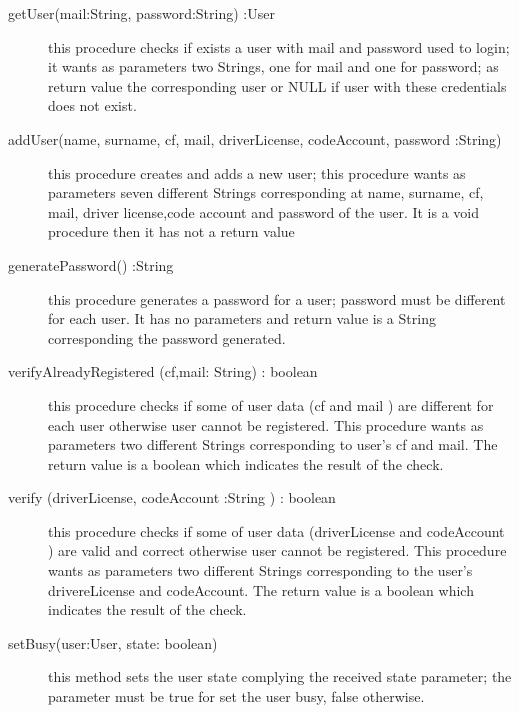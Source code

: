 \documentclass{scrreprt}
\begin{document}
\begin{description}
\item[getUser(mail:String, password:String) :User] this procedure checks if exists a user with mail and password used to login; it wants as parameters two Strings, one for mail and one for password; as return value the corresponding user or NULL if user with these credentials does not exist.
\item[addUser(name, surname, cf, mail, driverLicense, codeAccount, password :String)] this procedure creates and adds a new user; this procedure wants as parameters seven different Strings corresponding at name, surname, cf, mail, driver license,code account and password of the user. It is a void procedure then it has not a return value
\item[generatePassword() :String] this procedure generates a password for a user; password must be different for each user. It has no parameters and return value is a String corresponding the password generated.
\item[verifyAlreadyRegistered (cf,mail: String) : boolean] this procedure checks if some of user data (cf and mail ) are different for each user otherwise user cannot be registered. This procedure wants as parameters two different Strings corresponding to user's cf and mail. The return value is a boolean which indicates the result of the check.
\item[verify (driverLicense, codeAccount :String ) : boolean] this procedure checks if some of user data (driverLicense and codeAccount ) are valid and correct otherwise user cannot be registered. This procedure wants as parameters two different Strings corresponding to the user's drivereLicense and codeAccount. The return value is a boolean which indicates the result of the check.
\item[setBusy(user:User, state: boolean)] this method sets the user state complying the received state parameter; the parameter must be true for set the user busy, false otherwise.
\end{description}
\end{document}
